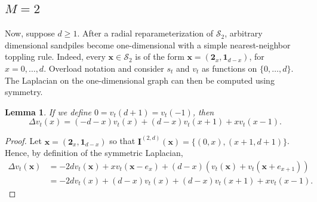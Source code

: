 \documentclass[12pt]{amsart}
\newtheorem{lemma}[theorem]{Lemma}
\begin{document}
	
	\subsection{\texorpdfstring{$M=2$}{M=2}}
	Now, suppose $d \geq 1$. After a radial reparameterization of $\mathcal{S}_2$, arbitrary dimensional sandpiles become one-dimensional with a simple nearest-neighbor 
	toppling rule.  Indeed, every $\mathbf{x} \in \mathcal{S}_2$ is of the form $\mathbf{x} =(\mathbf{2}_{x},\mathbf{1}_{d-x})$, for $x = 0, \ldots, d$. Overload notation and consider $s_t$ and $v_t$ as functions on $\{0, \ldots, d\}$. The Laplacian on the one-dimensional graph can then be computed using symmetry. 
	\begin{lemma}\label{radial_laplacian}
		If we define $0 = v_t(d+1) = v_t(-1)$, then 
		\[
		\Delta v_t(x) = (-d - x) v_t(x) + (d-x) v_t(x+1) + x v_t(x-1).
		\]
	\end{lemma}
	\begin{proof}
			Let $\mathbf{x} = (\mathbf{2}_{x},\mathbf{1}_{d-x})$ so that $\mathbf{I}^{(2,d)}(\mathbf{x}) = \{ (0,x), (x+1,d+1) \}$.
			Hence, by definition of the symmetric Laplacian, 
\begin{align*}
				\Delta v_t( \mathbf{x}) &= -2 d v_t(\mathbf{x}) + x v_t(\mathbf{x} - e_x) + (d-x) (v_t(\mathbf{x}) + v_t(\mathbf{x} + e_{x+1}))  \\
				&= -2d v_t(x) + (d-x) v_t(x) + (d-x) v_t(x+1) + x v_t(x-1).
\end{align*}

	

		
	\end{proof}
	
\end{document}
